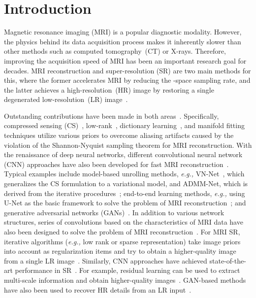 \documentclass[runningheads]{llncs}
\newcommand{\eg}[1]{\textit{e.g.,}}
\begin{document}
\section{Introduction}
Magnetic resonance imaging (MRI) is a popular diagnostic modality. However, the physics behind its data acquisition process makes it inherently slower than other methods such as computed tomography\!~(CT) or X-rays. Therefore, improving the acquisition speed of MRI has been an important research goal for decades. MRI reconstruction and super-resolution (SR) are two main methods for this, where the former accelerates MRI by reducing the -space sampling rate, and the latter achieves a high-resolution\!~(HR) image by restoring a single degenerated low-resolution\!~(LR) image~\cite{feng2021brain}.

Outstanding contributions have been made in both areas~\cite{feng2021MINet,feng2021DONet,feng2021accelerated}. Specifically, compressed sensing (CS)~\cite{lai2016image}, low-rank~\cite{shin2014calibrationless}, dictionary learning~\cite{ravishankar2010mr,zhan2015fast}, 
and manifold fitting~\cite{nakarmi2017kernel} techniques utilize various priors to overcome aliasing artifacts caused by the violation of the Shannon-Nyquist sampling theorem for MRI reconstruction. With the renaissance of deep neural networks, different convolutional neural network (CNN) approaches have also been developed for fast MRI reconstruction~\cite{zhu2018image,feng2021DualOctConv}. Typical examples include model-based unrolling methods, \eg, VN-Net~\cite{hammernik2018learning}, which generalizes the CS formulation to a variational model, and ADMM-Net, which is derived from the iterative procedures~\cite{yang2016deep}; end-to-end learning methods, \eg, using U-Net as the basic framework to solve the problem of MRI reconstruction~\cite{qin2018convolutional,huang2019mri}; and generative adversarial networks (GANs)~\cite{yang2017dagan,mardani2018deep}. In addition to various network structures, series of convolutions based on the characteristics of MRI data have also been designed to solve the problem of MRI reconstruction~\cite{feng2021DualOctConv,wang2020deepcomplexmri}. For MRI SR, iterative algorithms (\eg, low rank or sparse representation) take image priors into account  as regularization items and try to obtain a higher-quality image from a single LR image~\cite{wang2014sparse,zhang2007application}.
Similarly, CNN approaches have achieved state-of-the-art
performance in SR~\cite{chaudhari2018super,lyu2019super}. For example, residual learning can be used to extract multi-scale information and obtain higher-quality images~\cite{shi2018super,oktay2016multi}. GAN-based methods have also been used to recover HR details from an LR input~\cite{chen2018efficient,mahapatra2019image}. 
\end{document}
